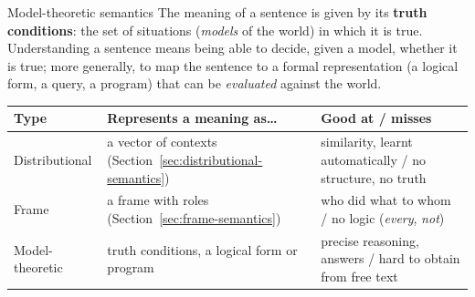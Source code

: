 \begin{nbdef}{Model-theoretic semantics}
The meaning of a sentence is given by its \textbf{truth conditions}: the set of
situations (\emph{models} of the world) in which it is true. Understanding a sentence
means being able to decide, given a model, whether it is true; more generally, to map
the sentence to a formal representation (a logical form, a query, a program) that can be
\emph{evaluated} against the world.
\end{nbdef}

\begin{center}
\small
\begin{tabularx}{\linewidth}{@{}l >{\raggedright\arraybackslash}X >{\raggedright\arraybackslash}X@{}}
\toprule
\textbf{Type} & \textbf{Represents a meaning as\ldots} & \textbf{Good at / misses} \\
\midrule
Distributional & a vector of contexts (Section~\ref{sec:distributional-semantics}) &
  similarity, learnt automatically / no structure, no truth \\
Frame & a frame with roles (Section~\ref{sec:frame-semantics}) &
  who did what to whom / no logic (\emph{every}, \emph{not}) \\
Model-theoretic & truth conditions, a logical form or program &
  precise reasoning, answers / hard to obtain from free text \\
\bottomrule
\end{tabularx}
\end{center}
